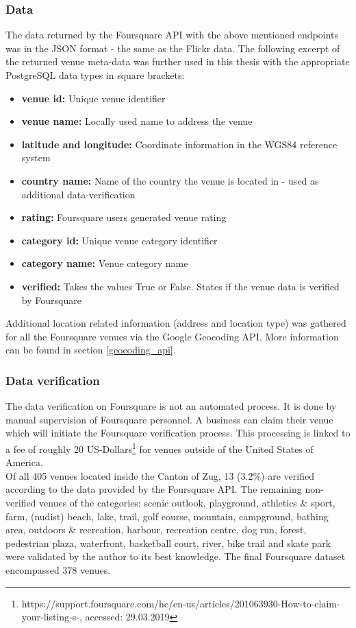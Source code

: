 \subsubsection{Data} \label{fq_data}
The data returned by the Foursquare API with the above mentioned endpoints was in the JSON format - the same as the Flickr data.
The following excerpt of the returned venue meta-data was further used in this thesis with the appropriate PostgreSQL data types in square brackets: \\
\begin{itemize}[label={}]
    \item \textbf{venue id:} Unique venue identifier 
    \item \textbf{venue name:} Locally used name to address the venue 
    \item \textbf{latitude and longitude:} Coordinate information in the WGS84 reference system 
    \item \textbf{country name:} Name of the country the venue is located in - used as additional data-verification 
    \item \textbf{rating:} Foursquare users generated venue rating 
    \item \textbf{category id:} Unique venue category identifier 
    \item \textbf{category name:} Venue category name 
    \item \textbf{verified:} Takes the values True or False. States if the venue data is verified by Foursquare 
\end{itemize}

Additional location related information (address and location type) was gathered for all the Foursquare venues via the Google Geocoding API. More information can be found in section \ref{geocoding_api}.

\subsubsection{Data verification} \label{foursquare_data_verification}
The data verification on Foursquare is not an automated process. It is done by manual supervision of Foursquare personnel. A business can claim their venue which will initiate the Foursquare verification process. This processing is linked to a fee of roughly 20 US-Dollars\footnote{https://support.foursquare.com/hc/en-us/articles/201063930-How-to-claim-your-listing-s-, accessed: 29.03.2019} for venues outside of the United States of America. \\
Of all 405 venues located inside the Canton of Zug, 13 (3.2\%) are verified according to the data provided by the Foursquare API. The remaining non-verified venues of the categories: scenic outlook, playground, athletics \& sport, farm, (nudist) beach, lake, trail, golf course, mountain, campground, bathing area, outdoors \& recreation, harbour, recreation centre, dog run, forest, pedestrian plaza, waterfront, basketball court, river, bike trail and skate park were validated by the author to its best knowledge. The final Foursquare dataset encompassed 378 venues.

